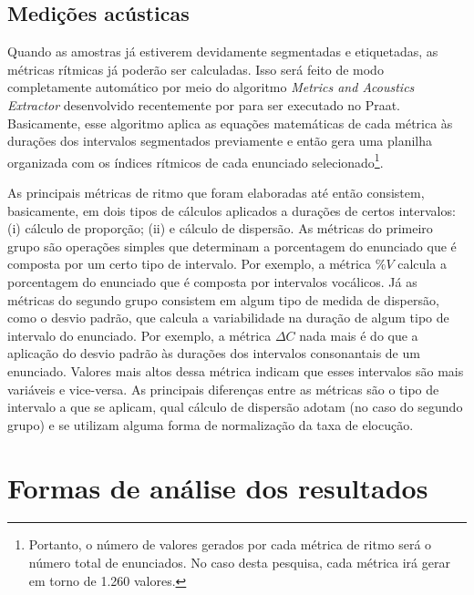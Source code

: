 \documentclass[
		a4paper,	%
		12pt,		%
		]{article}	%
\begin{document}
	\subsection{Medições acústicas} \label{medicoes}

	Quando as amostras já estiverem devidamente segmentadas e etiquetadas, as
	métricas rítmicas já poderão ser calculadas. Isso será feito de modo
	completamente automático por meio do algoritmo \emph{Metrics and Acoustics
		Extractor} desenvolvido recentemente por \citet{Junior.Barbosa2019} para
	ser executado no Praat. Basicamente, esse algoritmo aplica as equações
	matemáticas de cada métrica às durações dos intervalos segmentados
	previamente e então gera uma planilha organizada com os índices rítmicos de
	cada enunciado selecionado\footnote{Portanto, o número de valores gerados
		por cada métrica de ritmo será o número total de enunciados. No caso
		desta pesquisa, cada métrica irá gerar em torno de 1.260 valores.}.

	As principais métricas de ritmo que foram elaboradas até então consistem,
	basicamente, em dois tipos de cálculos aplicados a durações de certos
	intervalos: (i) cálculo de proporção; (ii) e cálculo de dispersão. As
	métricas do primeiro grupo são operações simples que determinam a
	porcentagem do enunciado que é composta por um certo tipo de intervalo. Por
	exemplo, a métrica $\%V$ \citep{Ramus.etal1999} calcula a porcentagem do
	enunciado que é composta por intervalos vocálicos. Já as métricas do segundo
	grupo consistem em algum tipo de medida de dispersão, como o desvio padrão,
	que calcula a variabilidade na duração de algum tipo de intervalo do
	enunciado. Por exemplo, a métrica $\Delta C$ \citep{Ramus.etal1999} nada
	mais é do que a aplicação do desvio padrão às durações dos intervalos
	consonantais de um enunciado. Valores mais altos dessa métrica indicam que
	esses intervalos são mais variáveis e vice-versa. As principais diferenças
	entre as métricas são o tipo de intervalo a que se aplicam, qual cálculo de
	dispersão adotam (no caso do segundo grupo) e se utilizam alguma forma de
	normalização da taxa de elocução. %

	\section{Formas de análise dos resultados} \label{analise}
\end{document}
